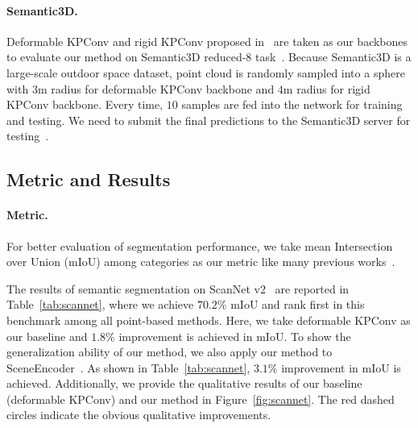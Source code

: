 \documentclass[final]{cvpr}
\begin{document}
\paragraph{Semantic3D.} Deformable KPConv and rigid KPConv proposed in~\cite{thomas2019kpconv} are taken as our backbones to evaluate our method on Semantic3D reduced-8 task~\cite{hackel2017semantic3d}. Because Semantic3D is a large-scale outdoor space dataset, point cloud is randomly sampled into a sphere with $3$m radius for deformable KPConv backbone and $4$m radius for rigid KPConv backbone. Every time, $10$ samples are fed into the network for training and testing. We need to submit the final predictions to the Semantic3D server for testing~\cite{hackel2017semantic3d}.

\subsection{Metric and Results}
\label{subsec:result}
\paragraph{Metric.} For better evaluation of segmentation performance, we take mean Intersection over Union (mIoU) among categories as our metric like many previous works~\cite{gong2021boundary, qi2017pointnet, thomas2019kpconv}.

The results of semantic segmentation on ScanNet v2~\cite{dai2017scannet} are reported in Table~\ref{tab:scannet}, where we achieve $70.2\%$ mIoU and rank first in this benchmark among all point-based methods. Here, we take deformable KPConv as our baseline and $1.8\%$ improvement is achieved in mIoU. To show the generalization ability of our method, we also apply our method to SceneEncoder~\cite{xu2020sceneencoder}. As shown in Table~\ref{tab:scannet}, $3.1\%$ improvement in mIoU is achieved. Additionally, we provide the qualitative results of our baseline (deformable KPConv) and our method in Figure~\ref{fig:scannet}. The red dashed circles indicate the obvious qualitative improvements.
\end{document}
